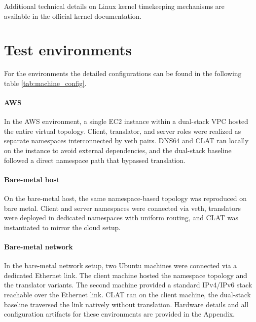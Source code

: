 \smallskip

 Additional technical details on Linux kernel timekeeping mechanisms are available in the official kernel documentation\cite{linux_timekeeping_doc}.

\section{Test environments}
For the environments the detailed configurations can be found in the following table \ref{tab:machine_config}.
\paragraph{AWS}
In the AWS environment, a single EC2 instance within a dual-stack VPC hosted the entire virtual topology. Client, translator, and server roles were realized as separate namespaces interconnected by veth pairs\cite{veth4}. DNS64 and CLAT ran locally on the instance to avoid external dependencies, and the dual-stack baseline followed a direct namespace path that bypassed translation.

\paragraph{Bare-metal host}
On the bare-metal host, the same namespace-based topology was reproduced on bare metal. Client and server namespaces were connected via veth, translators were deployed in dedicated namespaces with uniform routing, and CLAT was instantiated to mirror the cloud setup. 
\paragraph{Bare-metal network}
In the bare-metal network setup, two Ubuntu machines were connected via a dedicated Ethernet link. The client machine hosted the namespace topology and the translator variants. The second machine provided a standard IPv4/IPv6 stack reachable over the Ethernet link. CLAT ran on the client machine, the dual-stack baseline traversed the link natively without translation. Hardware details and all configuration artifacts for these environments are provided in the Appendix.


